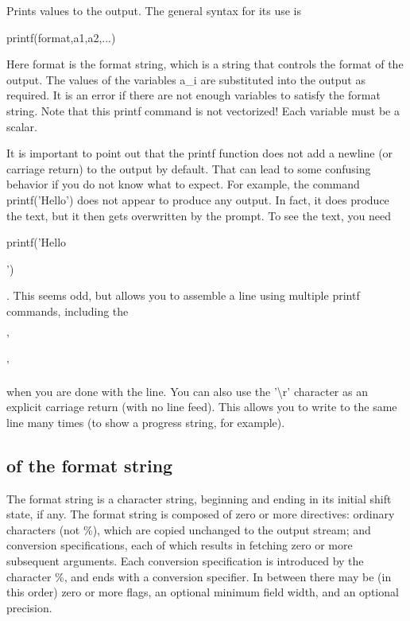 Prints values to the output. The general syntax for its use is \begin{DoxyVerb}  printf(format,a1,a2,...)
\end{DoxyVerb}
 Here {\ttfamily format} is the format string, which is a string that controls the format of the output. The values of the variables {\ttfamily a\-\_\-i} are substituted into the output as required. It is an error if there are not enough variables to satisfy the format string. Note that this {\ttfamily printf} command is not vectorized! Each variable must be a scalar.

It is important to point out that the {\ttfamily printf} function does not add a newline (or carriage return) to the output by default. That can lead to some confusing behavior if you do not know what to expect. For example, the command {\ttfamily printf('Hello')} does not appear to produce any output. In fact, it does produce the text, but it then gets overwritten by the prompt. To see the text, you need {\ttfamily printf('Hello\par
')}. This seems odd, but allows you to assemble a line using multiple {\ttfamily printf} commands, including the {\ttfamily '\par
'} when you are done with the line. You can also use the {\ttfamily '\textbackslash{}r'} character as an explicit carriage return (with no line feed). This allows you to write to the same line many times (to show a progress string, for example).\hypertarget{io_printf_Format}{}\subsection{of the format string}\label{io_printf_Format}
The format string is a character string, beginning and ending in its initial shift state, if any. The format string is composed of zero or more directives\-: ordinary characters (not \%), which are copied unchanged to the output stream; and conversion specifications, each of which results in fetching zero or more subsequent arguments. Each conversion specification is introduced by the character \%, and ends with a conversion specifier. In between there may be (in this order) zero or more flags, an optional minimum field width, and an optional precision.

